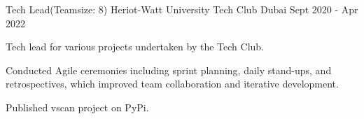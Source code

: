 
\begin{cventries}

  \cventry
    {Tech Lead(Teamsize: 8)} %
    {Heriot-Watt University Tech Club} %
    {Dubai} %
    {Sept 2020 - Apr 2022} %
    {
      \begin{cvitems} %
        \item {Tech lead for  various projects undertaken by the Tech Club.}
        \item {Conducted Agile ceremonies including sprint planning, daily stand-ups, and retrospectives, which improved team collaboration and iterative development.}
        \item {Published vscan project on PyPi.}
      \end{cvitems}
    }

\end{cventries}
